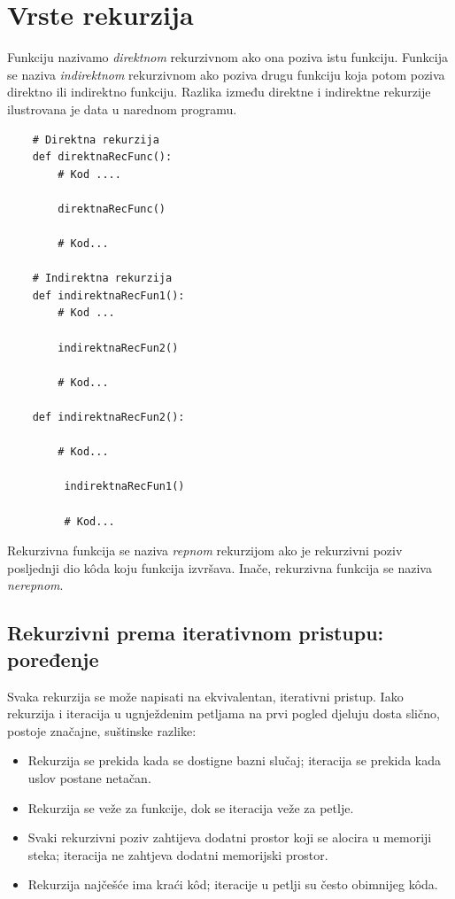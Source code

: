 \section{Vrste rekurzija}

Funkciju  nazivamo \textit{direktnom} rekurzivnom ako ona poziva istu funkciju. Funkcija  se naziva \textit{indirektnom} rekurzivnom ako poziva drugu funkciju koja potom poziva direktno ili indirektno funkciju. Razlika između direktne i indirektne rekurzije ilustrovana je data u narednom programu.

\begin{verbatim}
	# Direktna rekurzija
	def direktnaRecFunc():
	    # Kod ....
	
	    direktnaRecFunc()
	
	    # Kod...
	
	# Indirektna rekurzija
	def indirektnaRecFun1():
	    # Kod ...
	
	    indirektnaRecFun2()
	
	    # Kod...
	
	def indirektnaRecFun2():
	
	    # Kod...
	
	     indirektnaRecFun1()
	
	     # Kod...
\end{verbatim}



Rekurzivna funkcija se naziva \textit{repnom} rekurzijom ako je rekurzivni poziv posljednji dio k\^oda koju funkcija izvršava. Inače, rekurzivna funkcija se naziva \textit{nerepnom}.
 
\subsection{Rekurzivni prema iterativnom pristupu: poređenje}

Svaka rekurzija se može napisati na ekvivalentan, iterativni pristup. 
Iako rekurzija i iteracija u ugnježdenim petljama na prvi pogled djeluju dosta slično, postoje značajne, suštinske razlike:
\begin{itemize}
	\item Rekurzija se prekida kada se dostigne bazni slučaj; iteracija se prekida kada uslov postane netačan.
	\item Rekurzija se veže za funkcije, dok se iteracija veže za petlje.
	\item Svaki rekurzivni poziv zahtijeva dodatni prostor koji se alocira u memoriji steka; iteracija ne zahtjeva dodatni memorijski prostor.
	\item Rekurzija najčešće ima kraći k\^od; iteracije u petlji su često obimnijeg k\^oda. 
	
\end{itemize}


